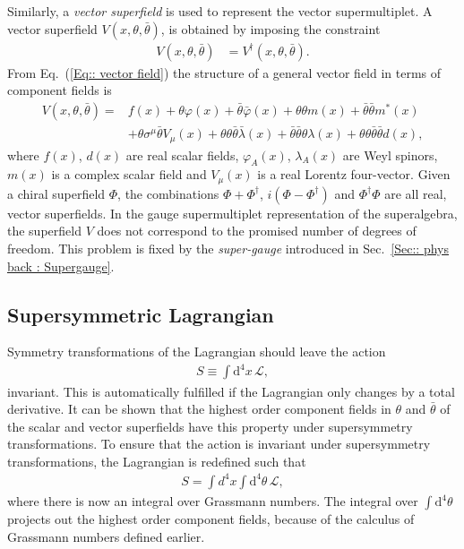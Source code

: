 \documentclass[twoside,english]{uiofysmaster}
\begin{document}
Similarly, a \textit{vector superfield} is used to represent the vector supermultiplet. A vector superfield  $V(x, \theta, \bar{\theta})$, is obtained by imposing the constraint
\begin{align}
V (x, \theta, \bar{\theta}) &= V^{\dagger} (x, \theta, \bar{\theta}).\label{Eq:: vector field}
\end{align}
From Eq.\ (\ref{Eq:: vector field}) the structure of a general vector field in terms of component fields is \cite{Martin:1997ns}
\begin{align}
V (x, \theta, \bar{\theta}) =& f(x) + \theta \varphi (x) + \bar{\theta} \bar{\varphi} (x) + \theta \theta m(x) + \bar{\theta} \bar{\theta} m^* (x) \nonumber \\
&+ \theta \sigma^{\mu} \bar{\theta} V_{\mu} (x) + \theta \theta \bar{\theta} \bar{\lambda} (x) + \bar{\theta} \bar{\theta} \theta \lambda (x) + \theta \theta \bar{\theta} \bar{\theta} d(x),
\end{align}
where $f(x)$, $d(x)$ are real scalar fields, $\varphi_A (x)$, $\lambda_A (x)$ are Weyl spinors, $m(x)$ is a complex scalar field and $V_{\mu} (x)$ is a real Lorentz four-vector. Given a chiral superfield $\Phi$, the combinations $\Phi + \Phi^{\dagger}$, $i (\Phi - \Phi^{\dagger})$ and $\Phi^{\dagger} \Phi$ are all real, vector superfields. In the gauge supermultiplet representation of the superalgebra, the superfield $V$ does not correspond to the promised number of degrees of freedom. This problem is fixed by the \textit{super-gauge} introduced in Sec.~\ref{Sec:: phys back : Supergauge}. 



\subsection{Supersymmetric Lagrangian}

Symmetry transformations of the Lagrangian should leave the action
\begin{align}
S \equiv \int \mathrm{d}^4x \, \mathcal{L},
\end{align}
 invariant. This is automatically fulfilled if the Lagrangian only changes by a total derivative. It can be shown that the highest order component fields in $\theta$ and $\bar{\theta}$ of the scalar and vector superfields have this property under supersymmetry transformations. To ensure that the action is invariant under supersymmetry transformations, the Lagrangian is redefined such that
\begin{align}
S = \int d^4x \int \mathrm{d}^4 \theta \, \mathcal{L},
\end{align}
where there is now an integral over Grassmann numbers. The integral over $\int \mathrm{d}^4 \theta$ projects out the highest order component fields, because of the calculus of Grassmann numbers defined earlier.
\end{document}
